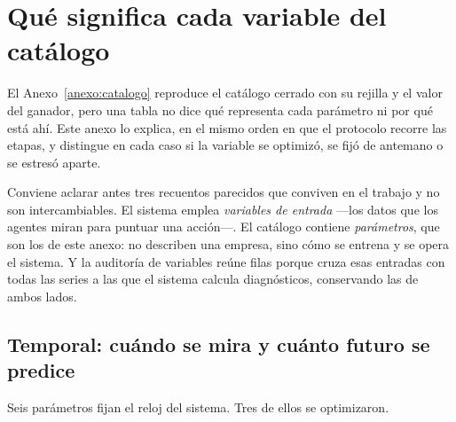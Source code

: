 \chapter{Qué significa cada variable del catálogo}
\label{anexo:variables}

El Anexo~\ref{anexo:catalogo} reproduce el catálogo cerrado con su rejilla y el valor del ganador,
pero una tabla no dice qué representa cada parámetro ni por qué está ahí. Este anexo lo explica, en
el mismo orden en que el protocolo recorre las etapas, y distingue en cada caso si la variable se
optimizó, se fijó de antemano o se estresó aparte.

Conviene aclarar antes tres recuentos parecidos que conviven en el trabajo y no son intercambiables.
El sistema emplea \NumPredictores{} \emph{variables de entrada} ---los datos que los agentes miran
para puntuar una acción---. El catálogo contiene \NumParametrosCatalogo{} \emph{parámetros}, que son
los de este anexo: no describen una empresa, sino cómo se entrena y se opera el sistema. Y la
auditoría de variables reúne \NumDiagnosticos{} filas porque cruza esas entradas con todas las
series a las que el sistema calcula diagnósticos, conservando las de ambos lados.

\section{Temporal: cuándo se mira y cuánto futuro se predice}

Seis parámetros fijan el reloj del sistema. Tres de ellos se optimizaron.

